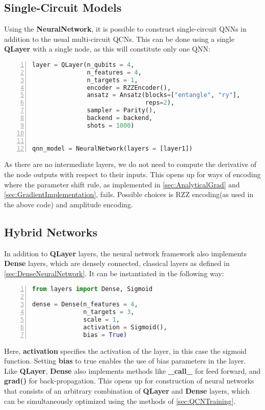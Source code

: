 \subsection{Single-Circuit Models}\label{sec:Single-CircuitModel}
Using the \textbf{NeuralNetwork}, it is possible to construct single-circuit QNNs in addition to the usual multi-circuit QCNs. This can be done using a single \textbf{QLayer} with a single node, as this will constitute only one QNN:
\begin{lstlisting}[language=python, numbers=left]
layer = QLayer(n_qubits = 4,
               n_features = 4,
               n_targets = 1,
               encoder = RZZEncoder(),
               ansatz = Ansatz(blocks=["entangle", "ry"],
                               reps=2),
               sampler = Parity(),
               backend = backend,
               shots = 1000)
                               

qnn_model = NeuralNetwork(layers = [layer1])
\end{lstlisting}
As there are no intermediate layers, we do not need to compute the derivative of the node outputs with respect to their inputs. This opens up for ways of encoding where the parameter shift rule, as implemented in \autoref{sec:AnalyticalGrad} and \autoref{sec:GradientImplementation}, fails. Possible choices is RZZ encoding(as used in the above code) and amplitude encoding.

\subsection{Hybrid Networks}\label{sec:Hybrid Networks}
In addition to \textbf{QLayer} layers, the neural network framework also implements \textbf{Dense} layers, which are densely connected, classical layers as defined in \autoref{sec:DenseNeuralNetwork}. It can be instantiated in the following way:

\begin{lstlisting}[language=python, numbers=left]
from layers import Dense, Sigmoid

dense = Dense(n_features = 4,
              n_targets = 3,
              scale = 1,
              activation = Sigmoid(),
              bias = True)
\end{lstlisting}
Here, \textbf{activation} specifies the activation of the layer, in this case the sigmoid function. Setting \textbf{bias} to true enables the use of bias parameters in the layer. Like \textbf{QLayer}, \textbf{Dense} also implements methods like \textbf{\_call\_} for feed forward, and \textbf{grad()} for back-propagation. This opens up for construction of neural networks that consists of an arbitrary combination of \textbf{QLayer} and \textbf{Dense} layers, which can be simultaneously optimized using the methods of \autoref{sec:QCNTraining}.

